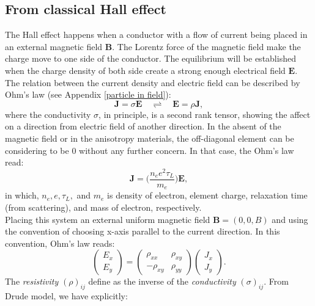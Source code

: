\documentclass[unnumsec,webpdf,modern,large]{mam-authoring-template}%
\theoremstyle{thmstyleone}%
\theoremstyle{thmstyletwo}%
\theoremstyle{thmstylethree}%
\begin{document}
\subsection{From classical Hall effect}\label{Introsub1}
\quad The Hall effect happens when a conductor with a flow of current being placed in an external magnetic field \(\textbf{B}\). The Lorentz force of the magnetic field make the charge move to one side of the conductor. The equilibrium will be established when the charge density of both side create a strong enough electrical field \(\textbf{E}\). The relation between the current density and electric field can be described by Ohm's law (see Appendix \ref{particle in field}):
\begin{equation}\label{Ohm}
	\textbf{J} = \sigma \textbf{E} \quad \rightleftharpoons \quad \textbf{E} = \rho \textbf{J},
\end{equation}
where the conductivity \(\sigma\), in principle, is a second rank tensor, showing the affect on a direction from electric field of another direction. In the absent of the magnetic field or in the anisotropy materials, the off-diagonal element can be considering to be 0 without any further concern. In that case, the Ohm's law read:
\begin{equation}\label{Ohm diag}
	\textbf{J} = \bigg(\frac{n_e e^2 \tau_L}{m_e}\bigg) \textbf{E},
\end{equation} 
in which, \(n_e, e,\tau_L,\) and \(m_e\) is density of electron, element charge, relaxation time (from scattering), and mass of electron, respectively.\\
\null\quad Placing this system an external uniform magnetic field \(\textbf{B} = (0,0,B)\) and using the convention of choosing x-axis parallel to the current direction. In this convention, Ohm's law reads:
\begin{equation*}
	\begin{pmatrix}
		E_x\\E_y
	\end{pmatrix}
	= \begin{pmatrix}
		\rho_{xx} & \rho_{xy}\\
		-\rho_{xy} & \rho_{yy}
	\end{pmatrix}
		\begin{pmatrix}
		J_x\\J_y
	\end{pmatrix}.
\end{equation*}
\quad The \textit{resistivity} \((\rho)_{ij}\) define as the inverse of the \textit{conductivity} \((\sigma)_{ij}\). From Drude model, we have explicitly:
\end{document}
